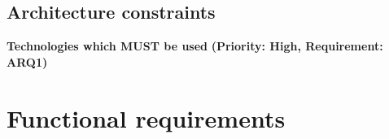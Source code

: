\documentclass[12pt]{article}
\begin{document}
	
			\vspace{0.2in}			
			
			
		
		\subsection{Architecture constraints}
	
		\vspace{0.2in}
		
		\begin{flushleft}
				\textbf{Technologies which MUST be used}
				\newline\textbf{(Priority: High, Requirement: ARQ1)}
		\end{flushleft}
			
			\vspace{0.05in}
		
	
	\section{Functional requirements}
	
		\vspace{0.2in}
		
\end{document}
